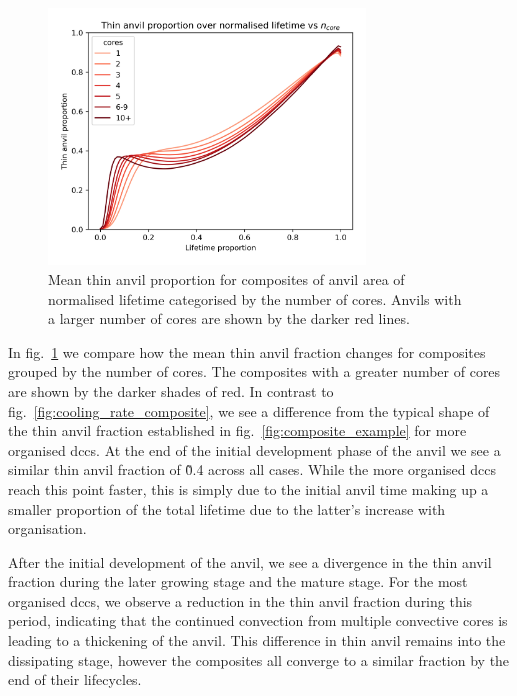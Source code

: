 \begin{figure}[tp]
    \centering
    \includegraphics[width=0.75\textwidth]{figures/chapter3_14.png}
    \caption[
    Mean thin anvil proportion for composites of anvil area of normalised lifetime categorised by the number of cores
    ]{
    Mean thin anvil proportion for composites of anvil area of normalised lifetime categorised by the number of cores. Anvils with a larger number of cores are shown by the darker red lines.
    }
    \label{fig:number_of_cores_composite}
\end{figure}

In fig.~\ref{fig:number_of_cores_composite} we compare how the mean thin anvil fraction changes for composites grouped by the number of cores.
The composites with a greater number of cores are shown by the darker shades of red.
In contrast to fig.~\ref{fig:cooling_rate_composite}, we see a difference from the typical shape of the thin anvil fraction established in fig.~\ref{fig:composite_example} for more organised \acrshort{dcc}s.
At the end of the initial development phase of the anvil we see a similar thin anvil fraction of \~0.4 across all cases.
While the more organised \acrshort{dcc}s reach this point faster, this is simply due to the initial anvil time making up a smaller proportion of the total lifetime due to the latter's increase with organisation.

After the initial development of the anvil, we see a divergence in the thin anvil fraction during the later growing stage and the mature stage.
For the most organised \acrshort{dcc}s, we observe a reduction in the thin anvil fraction during this period, indicating that the continued convection from multiple convective cores is leading to a thickening of the anvil.
This difference in thin anvil remains into the dissipating stage, however the composites all converge to a similar fraction by the end of their lifecycles.

